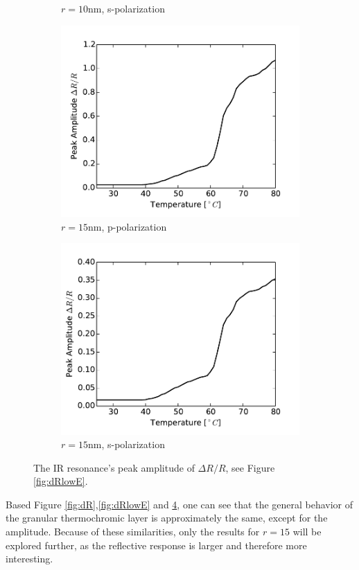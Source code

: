 \begin{figure}[h!]
\begin{subfigure}[b]{0.49\textwidth}
        \caption{$r=10$nm, s-polarization}
        \label{fig:IRpeak2}
    \end{subfigure}
    \begin{subfigure}[b]{0.49\textwidth}
        \centering
        \includegraphics[width=\textwidth]{Results/Sim3/dR_IRpeak_amp2.pdf}
        \caption{$r=15$nm, p-polarization}
        \label{fig:IRpeak3}
    \end{subfigure}
    \begin{subfigure}[b]{0.49\textwidth}
        \centering
        \includegraphics[width=\textwidth]{Results/Sim4/dR_IRpeak_amp2.pdf}
        \caption{$r=15$nm, s-polarization}
        \label{fig:IRpeak4}
    \end{subfigure}
    \caption{The IR resonance's peak amplitude of $\Delta R/R$, see Figure \ref{fig:dRlowE}.}
    \label{fig:IRpeak}
\end{figure}
%
%
Based Figure \ref{fig:dR},\ref{fig:dRlowE} and \ref{fig:IRpeak}, one can see that 
the general behavior of the granular thermochromic layer is approximately the same, except for
the amplitude. Because of these similarities, only the 
results for $r = 15$ will be explored further, as the reflective response is larger and therefore more 
interesting.

